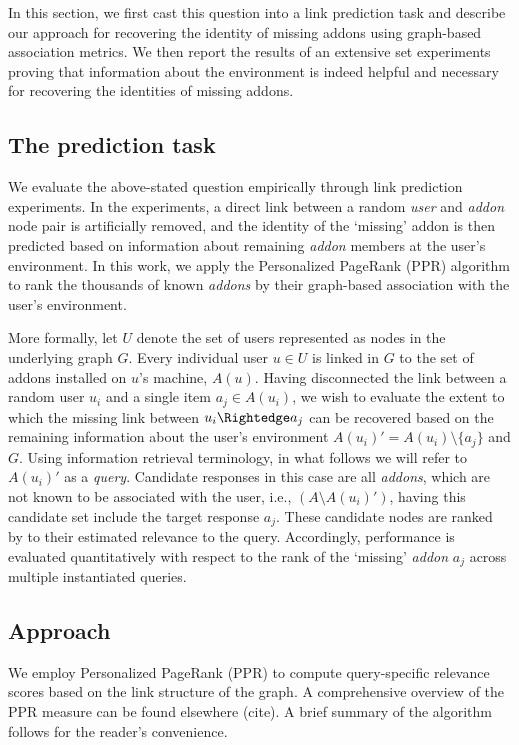 \documentclass[ijoc,nonblindrev]{informs3} %
\numberwithin{equation}{subsection}
\begin{document}
In this section, we first cast this question into a link prediction task and describe our approach for recovering the identity of missing addons using graph-based association metrics. We then report the results of an extensive set experiments proving that information about the environment is indeed helpful and necessary for recovering the identities of missing addons. 

\subsection{The prediction task}
\label{sec:task}

We evaluate the above-stated question empirically through link prediction experiments. In the experiments, a direct link between a random {\it user} and {\it addon} node pair is artificially removed, and the identity of the `missing' addon is then predicted based on information about remaining {\it addon} members at the user's environment. In this work, we apply the Personalized
PageRank (PPR) algorithm to rank the thousands of known {\it addons} by their graph-based association with the user's environment. 

More formally, let $U$ denote the set of users represented as nodes in the underlying graph $G$. Every individual user $u\in U$ is linked in $G$ to the set of addons installed on $u$'s machine, $A(u)$. Having disconnected the link between a random user $u_i$ and a single item $a_j \in A(u_i)$, we wish to evaluate the extent to which the missing link between $u_i \Rightedge a_j$ can be recovered based on the remaining information about the user's environment $A(u_i)'=A(u_i) \setminus \{a_j\}$ and $G$. Using information retrieval terminology, in what follows we will refer to $A(u_i)'$ as a {\it query}. Candidate responses in this case are all {\it addons}, which are not known to be associated with the user, i.e., $(A \setminus A(u_i)')$, having this candidate set include the target response $a_j$. These candidate nodes are ranked by to their estimated relevance to the query. Accordingly, performance is evaluated quantitatively with respect to the rank of the `missing' {\it addon} $a_j$ across multiple instantiated queries. 

\subsection{Approach}
\label{sec:method}

We employ Personalized PageRank (PPR) \citep{page1999pagerank} to compute query-specific relevance scores based on the link structure of the graph. A comprehensive overview of the PPR measure can be found elsewhere (cite). A brief summary of the algorithm follows for the reader's convenience.
\end{document}
